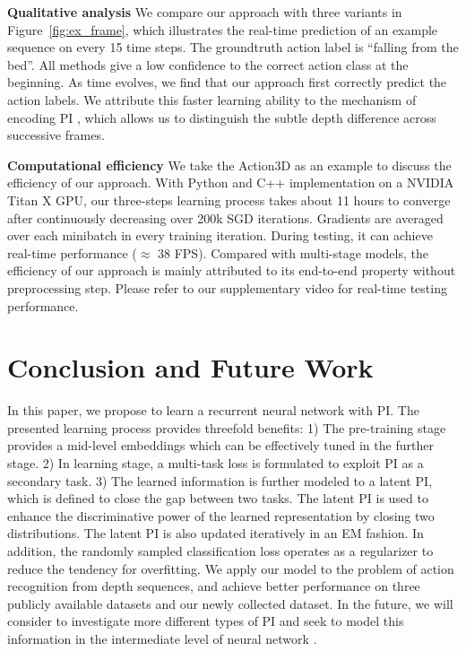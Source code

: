 \documentclass[10pt,twocolumn,letterpaper]{article}
\begin{document}
\noindent \textbf{Qualitative analysis} We compare our approach with three variants in Figure~\ref{fig:ex_frame}, which illustrates the real-time prediction of an example sequence on every 15 time steps. The groundtruth action label is ``falling from the bed''. All methods give a low confidence to the correct action class at the beginning. As time evolves, we find that our approach first correctly predict the action labels. We attribute this faster learning ability to the mechanism of encoding PI \cite{Seungryul_wacv_2016}, which allows us to distinguish the subtle depth difference across successive frames.





\noindent \textbf{Computational efficiency} We take the Action3D as an example to discuss the efficiency of our approach.  With Python and C++ implementation on a NVIDIA Titan X GPU, our three-steps learning process takes about 11 hours to converge after continuously decreasing over 200k SGD iterations. Gradients are averaged over each minibatch in every training iteration. During testing, it can achieve real-time performance ($\approx$ 38 FPS). Compared with multi-stage models, the efficiency of our approach is mainly attributed to its end-to-end property without preprocessing step. Please refer to our supplementary video for real-time testing performance.


\vspace{-0.3cm}

\section{Conclusion and Future Work}
\vspace{-0.15cm}
 In this paper, we propose to learn a recurrent neural network with PI. The presented learning process provides threefold benefits: 1) The pre-training stage provides a mid-level embeddings which can be effectively tuned in the further stage. 2) In learning stage, a multi-task loss is formulated to exploit PI as a secondary task. 3) The learned information is further modeled to a latent PI, which is defined to close the gap between two tasks. The latent PI is used to enhance the discriminative power of the learned representation by closing two distributions. The latent PI is also updated iteratively in an EM fashion. In addition, the randomly sampled classification loss operates as a regularizer to reduce the tendency for overfitting. We apply our model to the problem of action recognition from depth sequences, and achieve better performance on three publicly available datasets and our newly collected dataset. In the future, we will consider to investigate more different types of PI and seek to model this information in the intermediate level of neural network \cite{JMLR_gulchere16a}.



{\small


}
\end{document}
